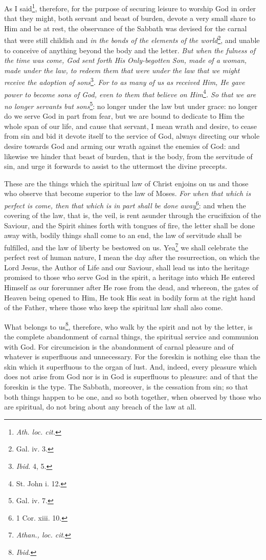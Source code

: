 As I said\footnote{\emph{Ath. loc. cit.}}, therefore, for the purpose of securing leisure to worship God in order that they might, both servant and beast of burden, devote a very small share to Him and be at rest, the observance of the Sabbath was devised for the carnal that were still childish and \emph{in the bonds of the elements of the world}\footnote{Gal. iv. 3.}, and unable to conceive of anything beyond the body and the letter. \emph{But when the fulness of the time was come, God sent forth His Only-begotten Son, made of a woman, made under the law, to redeem them that were under the law that we might receive the adoption of sons}\footnote{\emph{Ibid. }4, 5.}.\emph{ For to as many of us as received Him, He gave power to become sons of God, even to them that believe on Him}\footnote{St. John i. 12.}\emph{. So that we are no longer servants but sons}\footnote{Gal. iv. 7.}: no longer under the law but under grace: no longer do we serve God in part from fear, but we are bound to dedicate to Him the whole span of our life, and cause that servant, I mean wrath and desire, to cease from sin and bid it devote itself to the service of God, always directing our whole desire towards God and arming our wrath against the enemies of God: and likewise we hinder that beast of burden, that is the body, from the servitude of sin, and urge it forwards to assist to the uttermost the divine precepts.

These are the things which the spiritual law of Christ enjoins on us and those who observe that become superior to the law of Moses. \emph{For when that which is perfect is come, then that which is in part shall be done away}\footnote{1 Cor. xiii. 10.}: and when the covering of the law, that is, the veil, is rent asunder through the crucifixion of the Saviour, and the Spirit shines forth with tongues of fire, the letter shall be done away with, bodily things shall come to an end, the law of servitude shall be fulfilled, and the law of liberty be bestowed on us. Yea\footnote{\emph{Athan., loc. cit}.} we shall celebrate the perfect rest of human nature, I mean the day after the resurrection, on which the Lord Jesus, the Author of Life and our Saviour, shall lead us into the heritage promised to those who serve God in the spirit, a heritage into which He entered Himself as our forerunner after He rose from the dead, and whereon, the gates of Heaven being opened to Him, He took His seat in bodily form at the right hand of the Father, where those who keep the spiritual law shall also come.

What belongs to us\footnote{\emph{Ibid.}}, therefore, who walk by the spirit and not by the letter, is the complete abandonment of carnal things, the spiritual service and communion with God. For circumcision is the abandonment of carnal pleasure and of whatever is superfluous and unnecessary. For the foreskin is nothing else than the skin which it superfluous to the organ of lust. And, indeed, every pleasure which does not arise from God nor is in God is superfluous to pleasure: and of that the foreskin is the type. The Sabbath, moreover, is the cessation from sin; so that both things happen to be one, and so both together, when observed by those who are spiritual, do not bring about any breach of the law at all.

